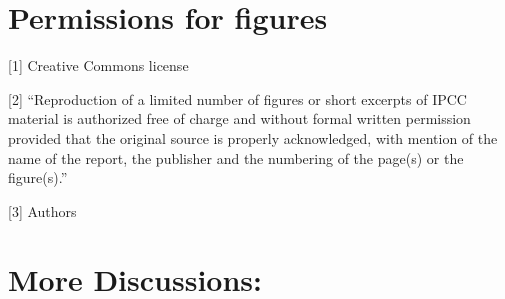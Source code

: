 \documentclass[12pt]{article}
\begin{document}
\iflater
\newpage
\section*{Permissions for figures}

[1] Creative Commons license

[2] ``Reproduction of a limited number of figures or short excerpts of IPCC material is authorized free of charge and without formal written permission provided that the original source is properly acknowledged, with mention of the name of the report, the publisher and the numbering of the page(s) or the figure(s).''

[3] Authors


\section*{More Discussions:}
\end{document}
